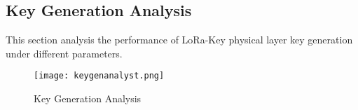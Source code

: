 \subsection{Key Generation Analysis}
This section analysis the performance of LoRa-Key physical layer key generation under different parameters.
\begin{figure}
  \centering
  \texttt{[image: keygenanalyst.png]}
  \caption{Key Generation Analysis}
  \label{keygenanalyst}
\end{figure}